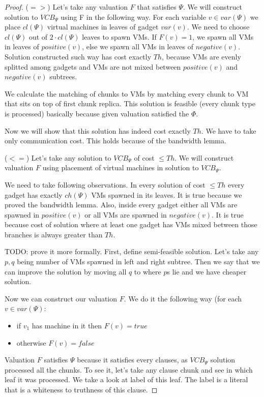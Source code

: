 \begin{proof}
($=>$) Let's take any valuation $F$ that satisfies $\Psi$. We will construct
solution to $VCB_{\Psi}$ using F in the following way. For each
variable $v \in var(\Psi)$ we place $cl(\Psi)$ virtual machines in
leaves of gadget $var(v)$. We need to choose $cl(\Psi)$ out of
$2 \cdot cl(\Psi)$ leaves to spawn VMs. If $F(v) = 1$, we spawn all VMs in leaves
of $positive(v)$, else we spawn all VMs in leaves of
$negative(v)$. Solution constructed such way has cost exactly
$Th$, because VMs are evenly splitted among gadgets and VMs are not
mixed between $positive(v)$ and $negative(v)$ subtrees.

We calculate the matching of chunks to VMs by matching every chunk to
VM that sits on top of first chunk replica. This solution is feasible
(every chunk type is processed) basically
because given valuation satisfied the $\Phi$.

Now we will show that this solution has indeed cost exactly $Th$. We have to
take only communication cost. This holds because of the bandwidth lemma.

($<=$) Let's take any solution to $VCB_{\Psi}$ of cost $\leq Th$. We
will construct valuation $F$ using placement of virtual machines in
solution to $VCB_{\Psi}$.

We need to take following observations. In every solution of cost
$\leq Th$ every gadget has exactly $ch(\Psi)$ VMs spawned in its
leaves. It is true because we proved the bandwidth lemma. Also, inside
every gadget either all VMs are spawned in $positive(v)$ or all VMs
are spawned in $negative(v)$. It is true because cost of solution
where at least one gadget has VMs mixed between those branches is
always greater than $Th$. 

TODO: prove it more formally. First, define semi-feasible solution. Let's take any $p,q$ being number of VMs
spawned in left and right subtree. Then we say that we can improve the
solution by moving all $q$ to where $p$s lie and we have cheaper solution.

Now we can construct our valuation $F$. We do it the following way
(for each $v \in var(\Psi)$:

\begin{itemize}
\item if $v_1$ has machine in it then $F(v) = true$
\item otherwise $F(v) = false$
\end{itemize}

Valuation $F$ satisfies $\Psi$ because it satisfies every clauses, as
$VCB_{\Psi}$ solution processed all the chunks. To see it, let's take
any clause chunk and see in which leaf it was processed. We take a
look at label of this leaf. The label is a literal that is a whiteness
to truthness of this clause.
\end{proof}


